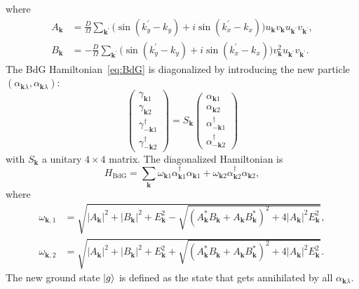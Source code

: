 \documentclass[11pt]{article}
\begin{document}
where
\begin{align}
    A_{\bm k} &= \frac{D}{\Omega}\sum_{\bm {k}^{\prime}}\bigg(\sin(k_{y}^\prime - k_{y})
    +i \sin(k_{x}^\prime - k_{x})\bigg)
    u_{\bm{k}} v_{\bm{k}} u_{\bm{k}^{\prime}} v_{\bm{k}^{\prime}},\\
    B_{\bm k} &= -\frac{D}{\Omega}\sum_{\bm {k}^{\prime}}\bigg(\sin(k_{y}^\prime - k_{y})
    +i \sin(k_{x}^\prime - k_{x})\bigg)
    v_{\bm{k}}^2 u_{\bm{k}^{\prime}} v_{\bm{k}^{\prime}}.
\end{align}
The BdG Hamiltonian~\eqref{eq:BdG} is diagonalized by introducing the new particle
$(\alpha_{\bm k \lambda}, \alpha_{\bm k \lambda})$:
\begin{equation}
    \begin{pmatrix}
    \gamma_{\bm k 1} \\
    \gamma_{\bm k 2} \\
    \gamma^\dagger_{-\bm k 1}\\
    \gamma^\dagger_{-\bm k 2}
    \end{pmatrix}
    = S_{\bm k}
    \begin{pmatrix}
    \alpha_{\bm k 1} \\
    \alpha_{\bm k 2} \\
    \alpha^\dagger_{-\bm k 1}\\
    \alpha^\dagger_{-\bm k 2}
    \end{pmatrix}
\end{equation}
with $S_{\bm k}$ a unitary $4\times 4$ matrix. The diagonalized Hamiltonian is
\begin{equation}
    H_{\text{BdG}} = \sum_{\bm k} \omega_{\bm k 1} \alpha^\dagger_{\bm k 1} \alpha_{\bm k 1}
    +\omega_{\bm k 2} \alpha^\dagger_{\bm k 2} \alpha_{\bm k 2},
\end{equation}
where
\begin{align}
    \omega_{\bm k, 1} &= \sqrt{|A_{\bm k}|^2+|B_{\bm k}|^2+ E_{\bm k}^2
    -\sqrt{\left(A_{\bm k}^* B_{\bm k}+A_{\bm k} B_{\bm k}^*\right)^2 + 4 |A_{\bm k}|^2 E_{\bm k}^2 }},\\
    \omega_{\bm k, 2} &= \sqrt{|A_{\bm k}|^2+|B_{\bm k}|^2+ E_{\bm k}^2
    +\sqrt{\left(A_{\bm k}^* B_{\bm k}+A_{\bm k} B_{\bm k}^*\right)^2 + 4 |A_{\bm k}|^2 E_{\bm k}^2 }}.
\end{align}
The new ground state $\left \rvert g \right \rangle$ is defined as the state that gets annihilated by all $\alpha_{\bm k \lambda}$.
\end{document}
